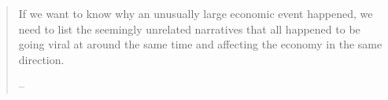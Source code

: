   \begin{quote}
    If we want to know why an unusually large economic event happened, we
    need to list the seemingly unrelated narratives that all happened to be
    going viral at around the same time and affecting the economy in the
    same direction.

    \medskip
        \indent -- \href{https://www.amazon.in/Narrative-Economics-Stories-Economic-Events-ebook/dp/B07RRDVTHY}{\cite{shiller2017narrative}}
  \end{quote}
